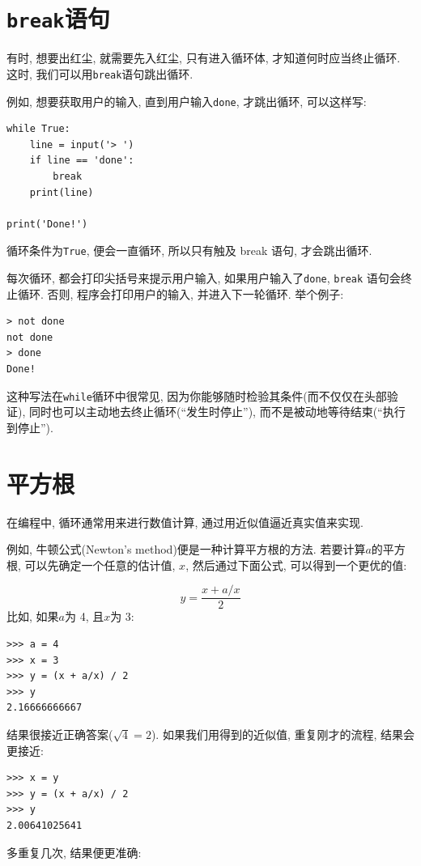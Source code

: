 \documentclass[10pt]{book}
\begin{document}
\section{{\tt break}语句}
有时, 想要出红尘, 就需要先入红尘, 只有进入循环体, 
才知道何时应当终止循环. 
这时, 我们可以用{\tt break}语句跳出循环. 

例如, 想要获取用户的输入, 直到用户输入{\tt done}, 才跳出循环, 可以这样写:

\begin{verbatim}
while True:
    line = input('> ')
    if line == 'done':
        break
    print(line)

print('Done!')
\end{verbatim}
%
循环条件为{\tt True}, 便会一直循环, 所以只有触及 break 语句, 才会跳出循环. 

每次循环, 都会打印尖括号来提示用户输入, 
如果用户输入了{\tt done}, {\tt break} 语句会终止循环. 
否则, 程序会打印用户的输入, 并进入下一轮循环. 
举个例子:

\begin{verbatim}
> not done
not done
> done
Done!
\end{verbatim}
%
这种写法在{\tt while}循环中很常见, 
因为你能够随时检验其条件(而不仅仅在头部验证), 
同时也可以主动地去终止循环(``发生时停止''), 
而不是被动地等待结束(``执行到停止'').


\section{平方根}
\label{squareroot}

在编程中, 循环通常用来进行数值计算, 通过用近似值逼近真实值来实现. 

例如, 牛顿公式(Newton's method)便是一种计算平方根的方法. 
若要计算$a$的平方根, 可以先确定一个任意的估计值, $x$, 
然后通过下面公式, 可以得到一个更优的值:

\[ y = \frac{x + a/x}{2} \]
%
比如, 如果$a$为 4, 且$x$为 3:

\begin{verbatim}
>>> a = 4
>>> x = 3
>>> y = (x + a/x) / 2
>>> y
2.16666666667
\end{verbatim}
%
结果很接近正确答案($\sqrt{4} = 2$).
如果我们用得到的近似值, 重复刚才的流程, 结果会更接近:

\begin{verbatim}
>>> x = y
>>> y = (x + a/x) / 2
>>> y
2.00641025641
\end{verbatim}
%
多重复几次, 结果便更准确:
\end{document}
